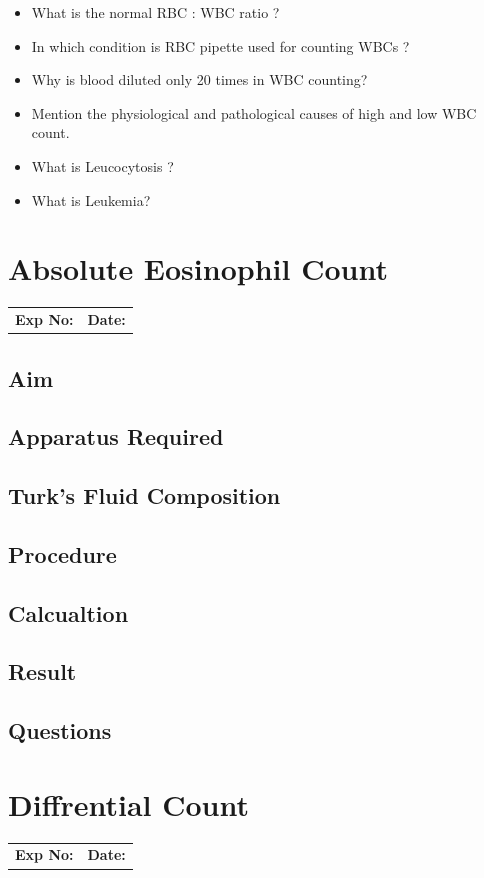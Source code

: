 \documentclass[a4paper,12pt]{book}
\begin{document}
\begin{itemize}

\item{What is the normal RBC : WBC ratio ?}
\item{ In which condition is RBC pipette used for counting WBCs ?}
\item{ Why is blood diluted only 20 times in WBC counting?}
\item{ Mention the physiological and pathological causes of high and low WBC count.}
\item{ What is Leucocytosis ?}
\item{ What is Leukemia?}
\end{itemize}

\chapter*{\centering Absolute Eosinophil Count}

		\begin{tabular}{p{5in} p{1in}}
			\textbf{Exp No:}  & \textbf{Date:}\\
		\end{tabular}

	\section*{Aim}
	\section*{Apparatus Required}
	\section*{Turk's Fluid Composition}
	\section*{Procedure}
	\section*{Calcualtion}
	\section*{Result}
	\section*{Questions}

\chapter*{\centering Diffrential Count}
		\begin{tabular}{p{5in} p{1in}}
			\textbf{Exp No:}  & \textbf{Date:}\\
		\end{tabular}
\end{document}
